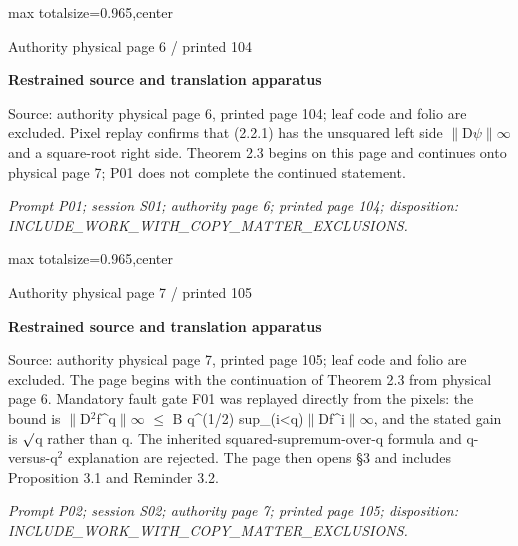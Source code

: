 \documentclass{article}
\begin{document}
\newpage
\noindent\begin{adjustbox}{max totalsize={\textwidth}{0.965\textheight},center}\begin{minipage}{\textwidth}
\noindent\hfill\scriptsize Authority physical page 6 / printed 104\par\normalsize
\textbf{Restrained source and translation apparatus}\par
Source: authority physical page 6, printed page 104; leaf code and folio are excluded. Pixel replay confirms that (2.2.1) has the unsquared left side \ensuremath{\lVert}D\ensuremath{\psi}\ensuremath{\lVert}\ensuremath{\infty} and a square-root right side. Theorem 2.3 begins on this page and continues onto physical page 7; P01 does not complete the continued statement.
\par\smallskip
\textit{Prompt P01; session S01; authority page 6; printed page 104; disposition: INCLUDE\_WORK\_WITH\_COPY\_MATTER\_EXCLUSIONS.}
\end{minipage}\end{adjustbox}

\newpage
\noindent\begin{adjustbox}{max totalsize={\textwidth}{0.965\textheight},center}\begin{minipage}{\textwidth}
\noindent\hfill\scriptsize Authority physical page 7 / printed 105\par\normalsize
\textbf{Restrained source and translation apparatus}\par
Source: authority physical page 7, printed page 105; leaf code and folio are excluded. The page begins with the continuation of Theorem 2.3 from physical page 6. Mandatory fault gate F01 was replayed directly from the pixels: the bound is \ensuremath{\lVert}D\ensuremath{{}^{2}}f\textasciicircum{}q\ensuremath{\lVert}\ensuremath{\infty} \ensuremath{\leq} B q\textasciicircum{}(1/2) sup\_(i<q)\ensuremath{\lVert}Df\textasciicircum{}i\ensuremath{\lVert}\ensuremath{\infty}, and the stated gain is \ensuremath{\sqrt{\vphantom{x}}}q rather than q. The inherited squared-supremum-over-q formula and q-versus-q\ensuremath{{}^{2}} explanation are rejected. The page then opens §3 and includes Proposition 3.1 and Reminder 3.2.
\par\smallskip
\textit{Prompt P02; session S02; authority page 7; printed page 105; disposition: INCLUDE\_WORK\_WITH\_COPY\_MATTER\_EXCLUSIONS.}
\end{minipage}\end{adjustbox}
\end{document}
